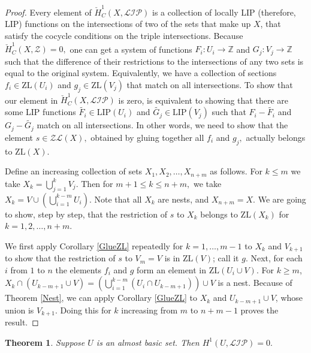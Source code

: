 \documentclass[10pt]{article}
\newtheorem{theorem}{Theorem}
\theoremstyle{definition}
\begin{document}
\begin{proof} Every element of  $\check{H}^1_{C} (X,\mathcal {LIP})$ is a collection of locally LIP (therefore, LIP) functions on the intersections of two of the sets that make up $X$, that satisfy the cocycle conditions on the triple intersections. Because $\check{H}^1_{C} (X,\mathcal {Z})=0,$  one can get a system of functions $F_i: U_i \to \mathbb Z$ and $G_j : V_j\to \mathbb Z$ such that the difference of their restrictions to the intersections of any two sets is equal to the original system. Equivalently, we have a collection of sections $f_i\in \textrm{ZL}(U_i)$ and $g_j\in \textrm{ZL}(V_j)$ that match on all intersections. To show that our element in $\check{H}^1_{C} (X,\mathcal {LIP})$ is zero, is equivalent to showing that there are some LIP functions $\tilde{F_i}\in \textrm{LIP}(U_i)$ and   $\tilde{G_j}\in \textrm{LIP}(V_j)$ such that  $F_i-\tilde{F_i}$ and $G_j-\tilde{G_j}$ match on all intersections. In other words, we need to show that the element $s\in \mathcal{ZL}(X),$ obtained by gluing together all $f_i$ and $g_j,$ actually belongs to $\textrm{ZL}(X)$.

 Define an increasing collection of sets $X_1,X_2,\ldots , X_{n+m}$ as follows. For $k\leq m$ we take $X_k=\bigcup_{j=1}^k V_j$. Then for $m+1\leq k \leq n+m,$ we take $X_k=V \cup (\bigcup_{i=1}^{k-m} U_i)$. Note that all $X_k$ are nests, and $X_{n+m}=X$. We are going to show, step by step, that the restriction of $s$ to $X_k$ belongs to $\textrm{ZL}(X_k)$ for $k=1,2,\ldots, n+m$. 
 
We first apply Corollary \ref{GlueZL} repeatedly for $k=1,\ldots, m-1$ to $X_k$ and $V_{k+1}$ to show that the restriction of $s$ to $V_m=V$ is in  $\textrm{ZL}(V)$; call it $g$. Next, for each $i$ from $1$ to $n$ the elements $f_i$ and $g$ form an element in $\textrm{ZL}(U_i\cup V)$. For $k\geq m$,  $X_{k} \cap (U_{k-m+1}\cup V) = (\bigcup_{i=1}^{k-m} (U_i\cap U_{k-m+1})) \cup V$ is a nest. Because of Theorem \ref{Nest}, we can apply Corollary \ref{GlueZL} to $X_k$ and $U_{k-m+1}\cup V$, whose union is $V_{k+1}$. Doing this for $k$ increasing from $m$ to $n+m-1$ proves the result.
\end{proof}


\begin{theorem} \label{H1basic}Suppose $U$ is an almost basic set. Then $H^1(U,\mathcal{LIP})=0.$
\end{theorem}
\end{document}
